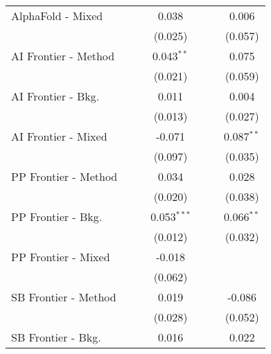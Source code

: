 \begin{tabular}{lcccccc}
   AlphaFold - Mixed    &               &               & 0.038          &               &               & 0.006\\   
                        &               &               & (0.025)        &               &               & (0.057)\\   
   AI Frontier - Method &               &               & 0.043$^{**}$   &               &               & 0.075\\   
                        &               &               & (0.021)        &               &               & (0.059)\\   
   AI Frontier - Bkg.   &               &               & 0.011          &               &               & 0.004\\   
                        &               &               & (0.013)        &               &               & (0.027)\\   
   AI Frontier - Mixed  &               &               & -0.071         &               &               & 0.087$^{**}$\\   
                        &               &               & (0.097)        &               &               & (0.035)\\   
   PP Frontier - Method &               &               & 0.034          &               &               & 0.028\\   
                        &               &               & (0.020)        &               &               & (0.038)\\   
   PP Frontier - Bkg.   &               &               & 0.053$^{***}$  &               &               & 0.066$^{**}$\\   
                        &               &               & (0.012)        &               &               & (0.032)\\   
   PP Frontier - Mixed  &               &               & -0.018         &               &               &   \\   
                        &               &               & (0.062)        &               &               &   \\   
   SB Frontier - Method &               &               & 0.019          &               &               & -0.086\\   
                        &               &               & (0.028)        &               &               & (0.052)\\   
   SB Frontier - Bkg.   &               &               & 0.016          &               &               & 0.022\\   

\end{tabular}
